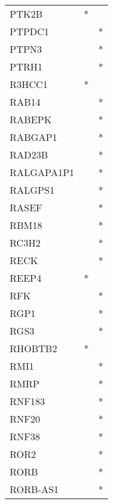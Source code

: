 \begin{longtable}{lcc}
PTK2B                 &              * &            \\
PTPDC1                &                &          * \\
PTPN3                 &                &          * \\
PTRH1                 &                &          * \\
R3HCC1                &              * &            \\
RAB14                 &                &          * \\
RABEPK                &                &          * \\
RABGAP1               &                &          * \\
RAD23B                &                &          * \\
RALGAPA1P1            &                &          * \\
RALGPS1               &                &          * \\
RASEF                 &                &          * \\
RBM18                 &                &          * \\
RC3H2                 &                &          * \\
RECK                  &                &          * \\
REEP4                 &              * &            \\
RFK                   &                &          * \\
RGP1                  &                &          * \\
RGS3                  &                &          * \\
RHOBTB2               &              * &            \\
RMI1                  &                &          * \\
RMRP                  &                &          * \\
RNF183                &                &          * \\
RNF20                 &                &          * \\
RNF38                 &                &          * \\
ROR2                  &                &          * \\
RORB                  &                &          * \\
RORB-AS1              &                &          * \\

\end{longtable}
